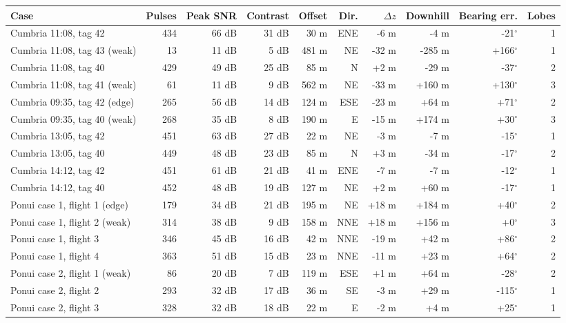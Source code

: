 \begin{tabular}{lrrrrrrrrr}
\toprule
Case & Pulses & Peak SNR & Contrast & Offset & Dir. & $\Delta z$ & Downhill & Bearing err. & Lobes \\
\midrule
Cumbria 11:08, tag 42 & 434 & 66 dB & 31 dB & 30 m & ENE & -6 m & -4 m & -21$^\circ$ & 1 \\
Cumbria 11:08, tag 43 (weak) & 13 & 11 dB & 5 dB & 481 m & NE & -32 m & -285 m & +166$^\circ$ & 1 \\
Cumbria 11:08, tag 40 & 429 & 49 dB & 25 dB & 85 m & N & +2 m & -29 m & -37$^\circ$ & 2 \\
Cumbria 11:08, tag 41 (weak) & 61 & 11 dB & 9 dB & 562 m & NE & -33 m & +160 m & +130$^\circ$ & 3 \\
Cumbria 09:35, tag 42 (edge) & 265 & 56 dB & 14 dB & 124 m & ESE & -23 m & +64 m & +71$^\circ$ & 2 \\
Cumbria 09:35, tag 40 (weak) & 268 & 35 dB & 8 dB & 190 m & E & -15 m & +174 m & +30$^\circ$ & 3 \\
Cumbria 13:05, tag 42 & 451 & 63 dB & 27 dB & 22 m & NE & -3 m & -7 m & -15$^\circ$ & 1 \\
Cumbria 13:05, tag 40 & 449 & 48 dB & 23 dB & 85 m & N & +3 m & -34 m & -17$^\circ$ & 2 \\
Cumbria 14:12, tag 42 & 451 & 61 dB & 21 dB & 41 m & ENE & -7 m & -7 m & -12$^\circ$ & 1 \\
Cumbria 14:12, tag 40 & 452 & 48 dB & 19 dB & 127 m & NE & +2 m & +60 m & -17$^\circ$ & 1 \\
Ponui case 1, flight 1 (edge) & 179 & 34 dB & 21 dB & 195 m & NE & +18 m & +184 m & +40$^\circ$ & 2 \\
Ponui case 1, flight 2 (weak) & 314 & 38 dB & 9 dB & 158 m & NNE & +18 m & +156 m & +0$^\circ$ & 3 \\
Ponui case 1, flight 3 & 346 & 45 dB & 16 dB & 42 m & NNE & -19 m & +42 m & +86$^\circ$ & 2 \\
Ponui case 1, flight 4 & 363 & 51 dB & 15 dB & 23 m & NNE & -11 m & +23 m & +64$^\circ$ & 2 \\
Ponui case 2, flight 1 (weak) & 86 & 20 dB & 7 dB & 119 m & ESE & +1 m & +64 m & -28$^\circ$ & 2 \\
Ponui case 2, flight 2 & 293 & 32 dB & 17 dB & 36 m & SE & -3 m & +29 m & -115$^\circ$ & 1 \\
Ponui case 2, flight 3 & 328 & 32 dB & 18 dB & 22 m & E & -2 m & +4 m & +25$^\circ$ & 1 \\
\bottomrule
\end{tabular}
